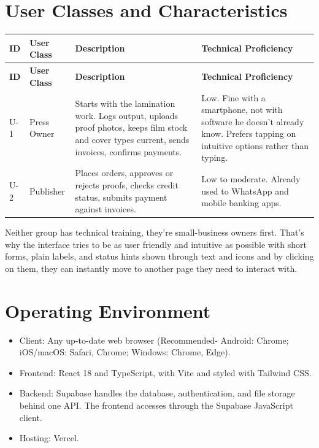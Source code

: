 \documentclass{scrreprt}
\begin{document}
\section{User Classes and Characteristics}
\begin{longtable}{L{0.10\textwidth} L{0.20\textwidth} L{0.45\textwidth} L{0.25\textwidth}}
\toprule
{} \textbf{ID} & \textbf{User Class} & \textbf{Description} & \textbf{Technical Proficiency} \\
\midrule
\endfirsthead
\toprule
{} \textbf{ID} & \textbf{User Class} & \textbf{Description} & \textbf{Technical Proficiency} \\
\midrule
\endhead
U-1 & Press Owner & Starts with the lamination work. Logs output, uploads proof photos, keeps film stock and cover types current, sends invoices, confirms payments. & Low. Fine with a smartphone, not with software he doesn't already know. Prefers tapping on intuitive options rather than typing. \\
U-2 & Publisher & Places orders, approves or rejects proofs, checks credit status, submits payment against invoices. & Low to moderate. Already used to WhatsApp and mobile banking apps. \\
\bottomrule
\end{longtable}

Neither group has technical training, they're small-business owners first. That's why the interface tries to be as user friendly and intuitive as possible with short forms, plain labels, and status hints shown through text and icons and by clicking on them, they can instantly move to another page they need to interact with.

\section{Operating Environment}
\begin{itemize}
\item Client: Any up-to-date web browser (Recommended- Android: Chrome; iOS/macOS: Safari, Chrome; Windows: Chrome, Edge).
\item Frontend: React 18 and TypeScript, with Vite and styled with Tailwind CSS.
\item Backend: Supabase handles the database, authentication, and file storage behind one API. The frontend accesses through the Supabase JavaScript client.
\item Hosting: Vercel.
\end{itemize}
\end{document}
